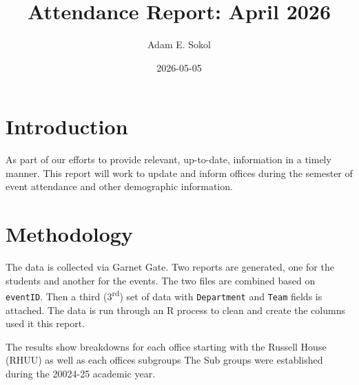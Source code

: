 \documentclass[
]{article}
\title{Attendance Report: April 2026}
\author{Adam E. Sokol}
\date{2026-05-05}
\begin{document}
\maketitle




\newpage

\pagestyle{plain}

\section{Introduction}\label{introduction}

\noindent As part of our efforts to provide relevant, up-to-date,
information in a timely manner. This report will work to update and
inform offices during the semester of event attendance and other
demographic information.

\section{Methodology}\label{methodology}

\noindent The data is collected via Garnet Gate. Two reports are
generated, one for the students and another for the events. The two
files are combined based on \texttt{eventID}. Then a third
(3\textsuperscript{rd}) set of data with \texttt{Department} and
\texttt{Team} fields is attached. The data is run through an R process
to clean and create the columns used it this report.

The results show breakdowns for each office starting with the Russell
House (RHUU) as well as each offices subgroups The Sub groups were
established during the 20024-25 academic year.
\end{document}
